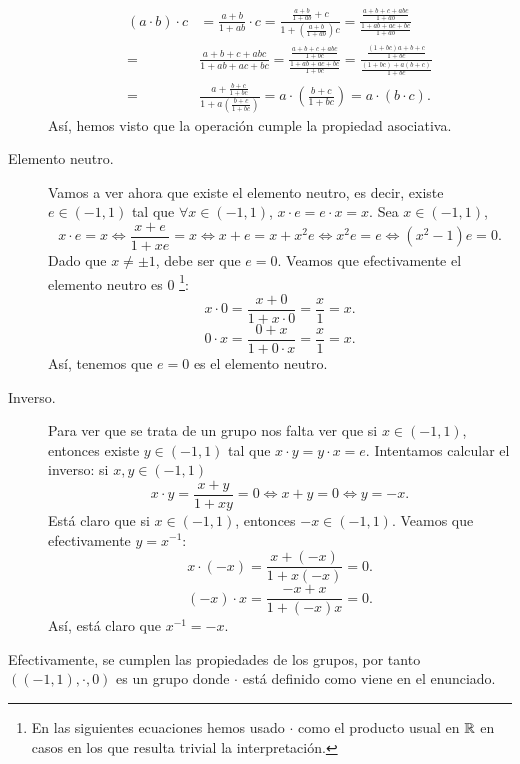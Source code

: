 \documentclass{article}
\begin{document}
\begin{description}
\[\begin{split}
		\left(a \cdot b\right) \cdot c & = \frac{a + b}{1 + ab} \cdot c = \frac{\frac{a+b}{1+ab} + c}{1 + \left(\frac{a + b}{1 + ab}\right)c} = \frac{\frac{a + b + c + abc}{1 + ab}}{\frac{1 + ab + ac + bc}{1 + ab}} \\
		= & \frac{a + b + c + abc}{1 + ab + ac + bc} = \frac{\frac{a + b + c + abc}{1 + bc}}{\frac{1 + ab + ac + bc}{1 + bc}} = \frac{\frac{\left(1+bc\right)a + b + c}{1 + bc}}{\frac{\left(1+ bc\right) + a\left(b+c\right)}{1 + bc}} \\
		= & \frac{a + \frac{b + c}{1 + bc}}{1 + a\left(\frac{b +c }{1 + bc}\right)} = a \cdot \left(\frac{b + c}{1 + bc}\right) = a \cdot \left(b \cdot c\right) .
	\end{split}
	\]
	Así, hemos visto que la operación cumple la propiedad asociativa.
\item[Elemento neutro.] Vamos a ver ahora que existe el elemento neutro, es decir, existe $\displaystyle e \in \left(-1,1\right) $ tal que $\displaystyle \forall x \in \left(-1,1\right) $, $\displaystyle x \cdot e = e \cdot x = x $. Sea $\displaystyle x \in \left(-1,1\right) $, 
	\[x \cdot e = x \iff \frac{x+e}{1 + x e} = x \iff x + e = x + x^{2}e \iff x^{2}e = e \iff \left(x^{2}-1\right)e = 0 .\]
Dado que $\displaystyle x \neq \pm 1 $, debe ser que $\displaystyle e = 0 $. Veamos que efectivamente el elemento neutro es 0 \footnote{En las siguientes ecuaciones hemos usado $\displaystyle \cdot  $ como el producto usual en $\displaystyle \mathbb{R} $ en casos en los que resulta trivial la interpretación.}:
\[ x \cdot 0 = \frac{x + 0}{1 + x \cdot   0} = \frac{x}{1} = x .\]
\[0 \cdot x = \frac{0 + x}{1 + 0 \cdot x} = \frac{x}{1} = x .\]
Así, tenemos que $\displaystyle e = 0 $ es el elemento neutro.
\item[Inverso.] Para ver que se trata de un grupo nos falta ver que si $\displaystyle x \in \left(-1,1\right) $, entonces existe $\displaystyle y \in \left(-1,1\right) $ tal que $\displaystyle x \cdot y = y \cdot x = e$. Intentamos calcular el inverso: si $\displaystyle x,y \in \left(-1,1\right) $ 
	\[x \cdot y = \frac{x + y}{1 + xy} = 0 \iff x + y = 0 \iff y = - x.\]
Está claro que si $\displaystyle x \in \left(-1,1\right) $, entonces $\displaystyle -x \in \left(-1,1\right) $. Veamos que efectivamente $\displaystyle y = x^{-1} $:
\[x \cdot \left(-x\right)= \frac{x + \left(-x\right)}{1 + x\left(-x\right)} = 0 .\]
\[\left(-x\right)\cdot x = \frac{-x +x }{1 + \left(-x\right)x} = 0 .\]
Así, está claro que $\displaystyle x^{-1} = -x $. 
\end{description}
Efectivamente, se cumplen las propiedades de los grupos, por tanto $\displaystyle \left(\left(-1,1\right), \cdot , 0\right) $ es un grupo donde $\displaystyle \cdot  $ está definido como viene en el enunciado.
\end{document}
